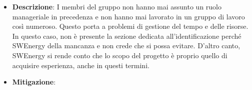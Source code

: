\label{risk:esperienza organizzativa carente}
\begin{itemize}
	\item \textbf{Descrizione}:
	      I membri del gruppo non hanno mai assunto un ruolo manageriale in
	      precedenza e non hanno mai lavorato in un gruppo di lavoro così
	      numeroso. Questo porta a problemi di gestione del tempo e delle
	      risorse. In questo caso, non è presente la sezione dedicata
	      all'identificazione perché SWEnergy della mancanza e non crede che si
	      possa evitare. D'altro canto, SWEnergy si rende conto che lo scopo del
	      progetto è proprio quello di acquisire esperienza, anche in questi
	      termini.
	\item \textbf{Mitigazione}:
	      \begin{itemize}
	      \end{itemize}
\end{itemize}
